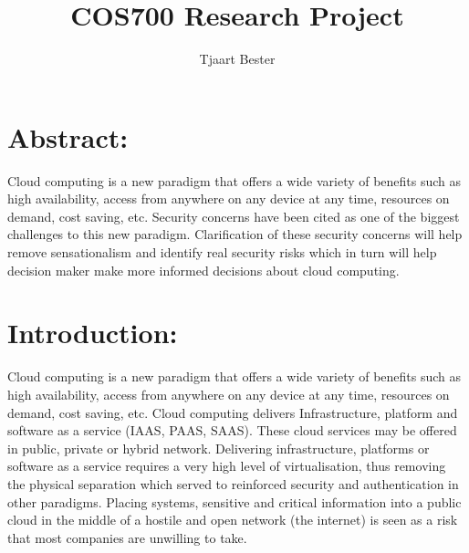 \documentclass[11pt]{article}
\author{Tjaart Bester}
\begin{document}
\title{COS700 Research Project}
\maketitle

\section{Abstract:}
Cloud computing is a new paradigm that offers a wide variety of benefits such as high availability, access from anywhere on any device at any time, resources on demand, cost saving, etc. Security concerns have been cited as one of the biggest challenges to this new paradigm. Clarification of these security concerns will help remove sensationalism and identify real security risks which in turn will help decision maker make more informed decisions about cloud computing.   










\section{Introduction:}
Cloud computing is a new paradigm that offers a wide variety of benefits such as high availability, access from anywhere on any device at any time, resources on demand, cost saving, etc. Cloud computing delivers Infrastructure, platform and software as a service (IAAS, PAAS, SAAS). These cloud services may be offered in public, private or hybrid network. Delivering infrastructure, platforms or software as a service requires a very high level of virtualisation, thus removing the physical separation which served to reinforced security and authentication in other paradigms. Placing systems, sensitive and critical information into a public cloud in the middle of a hostile and open network (the internet) is seen as a risk that most companies are unwilling to take. 
\end{document}
